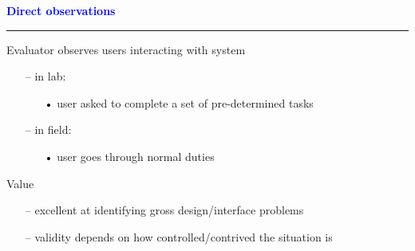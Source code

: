 \documentclass[pdf]{beamer}
\begin{document}
{%
{
\begin{frame}
	\textcolor{Blue}{\textbf{\Large{Direct observations}}}
    \textcolor{red}{\rule{10cm}{1mm}}
    Evaluator observes users interacting with system\par
    \begin{itemize}
    \item[\textcolor{black}{--}] in lab:
    	\begin{itemize}
    	\item[\textcolor{black}{•}] user asked to complete a set of pre-determined tasks
    	\end{itemize}
    \item[\textcolor{black}{--}] in field: 
    	\begin{itemize}
    	\item[\textcolor{black}{•}] user goes through normal duties
    	\end{itemize}
    \end{itemize}
    Value\par
    \begin{itemize}
    \item[\textcolor{black}{--}] excellent at identifying gross design/interface problems
    \item[\textcolor{black}{--}] validity depends on how controlled/contrived the situation is
    \end{itemize}
\end{frame}}

}
\end{document}
